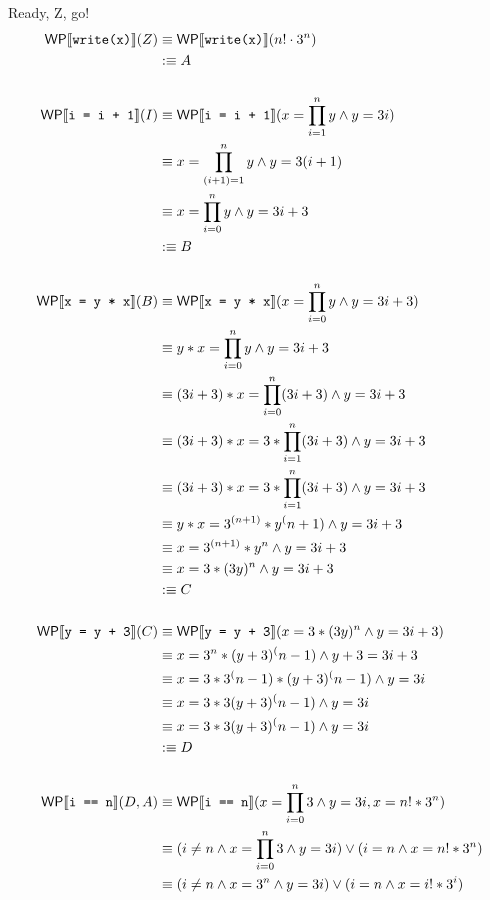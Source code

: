\documentclass[
  english
]{tumteaching}
\begin{document}
\begin{assignment}[H, points=6]{Ready, Z, go!}
	\begin{align*}	
		\textsf{WP}\llbracket{}\texttt{write(x)}\rrbracket{}(Z)
		&\equiv \textsf{WP}\llbracket{}\texttt{write(x)}\rrbracket{}(n! \cdot 3^n)\\
		&:\equiv A		\\
		\\
		\textsf{WP}\llbracket{}\texttt{i = i + 1}\rrbracket{}(I) 
		&\equiv \textsf{WP}\llbracket{}\texttt{i = i + 1}\rrbracket{}(x = \prod \limits_{i = 1}^{n} y \land y = 3i) \\
		&\equiv x = \prod \limits_{(i+1) = 1}^{n} y \land y = 3(i+1) \\
		&\equiv x = \prod \limits_{i = 0}^{n} y \land y = 3i + 3 \\
		&:\equiv B \\
		\\	
		\textsf{WP}\llbracket{}\texttt{x = y * x}\rrbracket{}(B) 
		&\equiv \textsf{WP}\llbracket{}\texttt{x = y * x}\rrbracket{}(x = \prod \limits_{i = 0}^{n} y \land y = 3i + 3) \\
		&\equiv y * x = \prod \limits_{i = 0}^{n} y \land y = 3i + 3 \\
		&\equiv (3i + 3) * x = \prod \limits_{i = 0}^{n} (3i + 3) \land y = 3i + 3 \\	
		&\equiv (3i + 3) * x = 3 * \prod \limits_{i = 1}^{n} (3i + 3) \land y = 3i + 3 \\	
		&\equiv (3i + 3) * x = 3 * \prod \limits_{i = 1}^{n} (3i + 3) \land y = 3i + 3 \\	
		&\equiv y * x = 3^{(n+1)} * y^(n+1) \land y = 3i + 3 \\	
		&\equiv x = 3^{(n+1)} * y^n \land y = 3i + 3 \\
		&\equiv x = 3* (3y)^n \land y = 3i + 3 \\
		&:\equiv C \\
		\\
		\textsf{WP}\llbracket{}\texttt{y = y + 3}\rrbracket{}(C) 
		&\equiv \textsf{WP}\llbracket{}\texttt{y = y + 3}\rrbracket{}(x = 3* (3y)^n \land y = 3i + 3) \\
		&\equiv x = 3^n * (y+3)^(n-1) \land y + 3 = 3i + 3 \\
		&\equiv x = 3 * 3^(n-1) * (y+3)^(n-1) \land y = 3i \\
		&\equiv x = 3 * 3(y+3)^(n-1) \land y = 3i \\
		&\equiv x = 3 * 3(y+3)^(n-1) \land y = 3i \\
		&:\equiv D \\
		\\
		\textsf{WP}\llbracket{}\texttt{i == n}\rrbracket{}(D, A)
		&\equiv \textsf{WP}\llbracket{}\texttt{i == n}\rrbracket{}(x = \prod \limits_{i = 0}^{n} 3 \land y = 3i, x = n! * 3^n) \\
		&\equiv  (i \neq n \land x = \prod \limits_{i = 0}^{n} 3 \land y = 3i) \lor (i = n \land x = n! * 3^n) \\
		&\equiv  (i \neq n \land x = 3^n \land y = 3i) \lor (i = n \land x = i! * 3^i)
	\end{align*}



\end{assignment}
\end{document}
